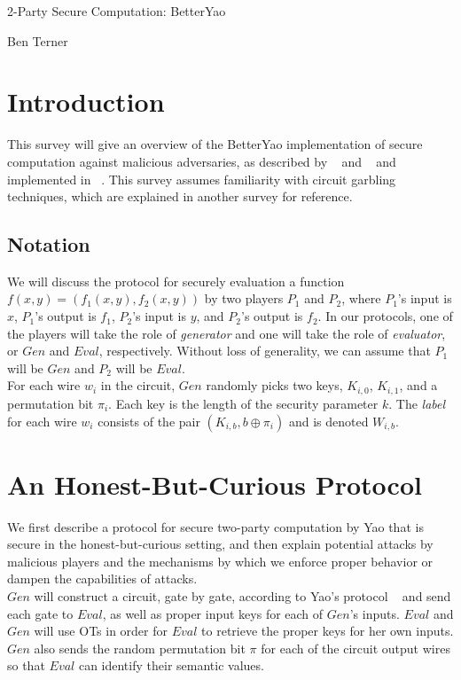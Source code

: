 \documentclass{article}
\author{\textbf{\hmwkAuthorName}}
\date{}
\begin{document}
\centerline{{\Large 2-Party Secure Computation: BetterYao}}

\centerline{{\large Ben Terner}}

\section{Introduction}
This survey will give an overview of the BetterYao implementation of secure computation against malicious adversaries, as described by ~\cite{two-output} and ~\cite{fast2pc} and implemented in ~\cite{billiongate}. This survey assumes familiarity with circuit garbling techniques, which are explained in another survey for reference.

\subsection{Notation}
We will discuss the protocol for securely evaluation a function $f(x,y) = (f_{1}(x,y),f_{2}(x,y))$ by two players $P_{1}$ and $P_{2}$, where $P_{1}$'s input is $x$, $P_{1}$'s output is $f_{1}$, $P{_2}$'s input is $y$, and $P_{2}$'s output is $f_{2}$. In our protocols, one of the players will take the role of \emph{generator} and one will take the role of \emph{evaluator}, or $Gen$ and $Eval$, respectively. Without loss of generality, we can assume that $P_{1}$ will be $Gen$ and $P_{2}$ will be $Eval$. \\

For each wire $w_{i}$ in the circuit, $Gen$ randomly picks two keys, $K_{i,0}$, $K_{i,1}$, and a permutation bit $\pi_{i}$. Each key is the length of the security parameter $k$. The {\it label} for each wire $w_{i}$ consists of the pair $(K_{i,b}, b \oplus \pi_{i})$ and is denoted $W_{i,b}$.

\section{An Honest-But-Curious Protocol}\label{sec:HBC}
We first describe a protocol for secure two-party computation by Yao that is secure in the honest-but-curious setting, and then explain potential attacks by malicious players and the mechanisms by which we enforce proper behavior or dampen the capabilities of attacks. \\

$Gen$ will construct a circuit, gate by gate, according to Yao's protocol ~\cite{yaoprotocols} and send each gate to $Eval$, as well as proper input keys for each of $Gen$'s inputs. $Eval$ and $Gen$ will use OTs in order for $Eval$ to retrieve the proper keys for her own inputs. $Gen$ also sends the random permutation bit $\pi$ for each of the circuit output wires so that $Eval$ can identify their semantic values.  \\
\end{document}
